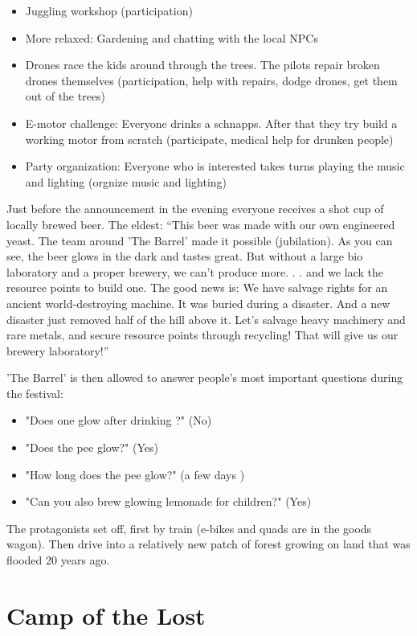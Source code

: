 \begin{itemize}
\item Juggling workshop (participation)
\item More relaxed: Gardening and chatting with the local NPCs
\item Drones race the kids around through the trees. The pilots repair broken drones themselves (participation, help with repairs, dodge drones, get them out of the trees)
\item E-motor challenge: Everyone drinks a schnapps. After that they try build a working motor from scratch (participate, medical help for drunken people)
\item Party organization: Everyone who is interested takes turns playing the music and lighting (orgnize music and lighting)
\end{itemize}

Just before the announcement in the evening everyone receives a shot cup of locally brewed beer. The eldest: “This beer was made with our own engineered yeast. The team around 'The Barrel' made it possible (jubilation). As you can see, the beer glows in the dark and tastes great. But without a large bio laboratory and a proper brewery, we can't produce more. . . and we lack the resource points to build one. The good news is: We have salvage rights for an ancient world-destroying machine. It was buried during a  disaster. And a new disaster just removed half of the hill above it. Let's salvage heavy machinery and rare metals, and secure resource points through recycling! That will give us our brewery laboratory!”

'The Barrel' is then allowed to answer people's most important questions during the festival: 
\begin{itemize}
\item "Does one glow after drinking ?" (No)
\item "Does the pee glow?" (Yes)
\item "How long does the pee glow?" (a few days )
\item "Can you also brew glowing lemonade for children?" (Yes)
\end{itemize}

The protagonists set off, first by train (e-bikes and quads are in the goods wagon). Then drive into a relatively new patch of forest growing on land that was flooded 20 years ago.


\section{Camp of the Lost}

